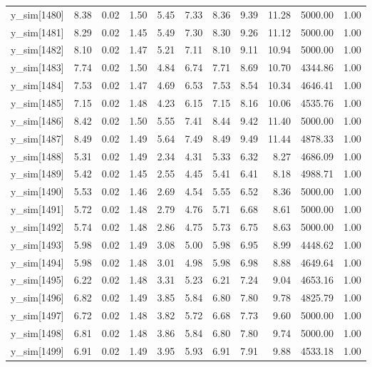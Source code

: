 \begin{table}[ht]
\begin{tabular}{rrrrrrrrrrr}
  y\_sim[1480] & 8.38 & 0.02 & 1.50 & 5.45 & 7.33 & 8.36 & 9.39 & 11.28 & 5000.00 & 1.00 \\ 
  y\_sim[1481] & 8.29 & 0.02 & 1.45 & 5.49 & 7.30 & 8.30 & 9.26 & 11.12 & 5000.00 & 1.00 \\ 
  y\_sim[1482] & 8.10 & 0.02 & 1.47 & 5.21 & 7.11 & 8.10 & 9.11 & 10.94 & 5000.00 & 1.00 \\ 
  y\_sim[1483] & 7.74 & 0.02 & 1.50 & 4.84 & 6.74 & 7.71 & 8.69 & 10.70 & 4344.86 & 1.00 \\ 
  y\_sim[1484] & 7.53 & 0.02 & 1.47 & 4.69 & 6.53 & 7.53 & 8.54 & 10.34 & 4646.41 & 1.00 \\ 
  y\_sim[1485] & 7.15 & 0.02 & 1.48 & 4.23 & 6.15 & 7.15 & 8.16 & 10.06 & 4535.76 & 1.00 \\ 
  y\_sim[1486] & 8.42 & 0.02 & 1.50 & 5.55 & 7.41 & 8.44 & 9.42 & 11.40 & 5000.00 & 1.00 \\ 
  y\_sim[1487] & 8.49 & 0.02 & 1.49 & 5.64 & 7.49 & 8.49 & 9.49 & 11.44 & 4878.33 & 1.00 \\ 
  y\_sim[1488] & 5.31 & 0.02 & 1.49 & 2.34 & 4.31 & 5.33 & 6.32 & 8.27 & 4686.09 & 1.00 \\ 
  y\_sim[1489] & 5.42 & 0.02 & 1.45 & 2.55 & 4.45 & 5.41 & 6.41 & 8.18 & 4988.71 & 1.00 \\ 
  y\_sim[1490] & 5.53 & 0.02 & 1.46 & 2.69 & 4.54 & 5.55 & 6.52 & 8.36 & 5000.00 & 1.00 \\ 
  y\_sim[1491] & 5.72 & 0.02 & 1.48 & 2.79 & 4.76 & 5.71 & 6.68 & 8.61 & 5000.00 & 1.00 \\ 
  y\_sim[1492] & 5.74 & 0.02 & 1.48 & 2.86 & 4.75 & 5.73 & 6.75 & 8.63 & 5000.00 & 1.00 \\ 
  y\_sim[1493] & 5.98 & 0.02 & 1.49 & 3.08 & 5.00 & 5.98 & 6.95 & 8.99 & 4448.62 & 1.00 \\ 
  y\_sim[1494] & 5.98 & 0.02 & 1.48 & 3.01 & 4.98 & 5.98 & 6.98 & 8.88 & 4649.64 & 1.00 \\ 
  y\_sim[1495] & 6.22 & 0.02 & 1.48 & 3.31 & 5.23 & 6.21 & 7.24 & 9.04 & 4653.16 & 1.00 \\ 
  y\_sim[1496] & 6.82 & 0.02 & 1.49 & 3.85 & 5.84 & 6.80 & 7.80 & 9.78 & 4825.79 & 1.00 \\ 
  y\_sim[1497] & 6.72 & 0.02 & 1.48 & 3.82 & 5.72 & 6.68 & 7.73 & 9.60 & 5000.00 & 1.00 \\ 
  y\_sim[1498] & 6.81 & 0.02 & 1.48 & 3.86 & 5.84 & 6.80 & 7.80 & 9.74 & 5000.00 & 1.00 \\ 
  y\_sim[1499] & 6.91 & 0.02 & 1.49 & 3.95 & 5.93 & 6.91 & 7.91 & 9.88 & 4533.18 & 1.00 \\ 

\end{tabular}
\end{table}
